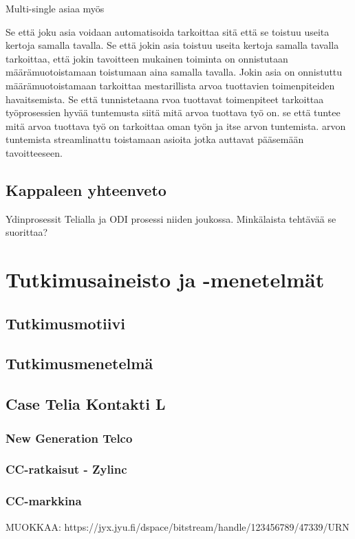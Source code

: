 \documentclass[finnish,12pt,a4paper,pdftex]{article}
\begin{document}
Multi-single asiaa myös


Se että joku asia voidaan automatisoida tarkoittaa sitä että se toistuu useita kertoja samalla tavalla. Se että jokin asia toistuu useita kertoja samalla tavalla tarkoittaa, että jokin tavoitteen mukainen toiminta on onnistutaan määrämuotoistamaan toistumaan aina samalla tavalla. Jokin asia on onnistuttu määrämuotoistamaan tarkoittaa mestarillista arvoa tuottavien toimenpiteiden havaitsemista. Se
 että tunnistetaana rvoa tuottavat toimenpiteet tarkoittaa työprosessien hyvää tuntemusta siitä mitä arvoa tuottava työ on. se että tuntee mitä arvoa tuottava työ on tarkoittaa oman työn ja itse arvon tuntemista.
arvon tuntemista
streamlinattu toistamaan asioita jotka auttavat pääsemään tavoitteeseen. 


\subsection{Kappaleen yhteenveto}


Ydinprosessit Telialla ja ODI prosessi niiden joukossa. Minkälaista tehtävää se suorittaa?

\clearpage

\section{Tutkimusaineisto ja -menetelmät}
\subsection{Tutkimusmotiivi}
\subsection{Tutkimusmenetelmä}
\subsection{Case Telia Kontakti L}
\subsubsection{New Generation Telco}
\subsubsection{CC-ratkaisut - Zylinc}
\subsubsection{CC-markkina}
MUOKKAA: https://jyx.jyu.fi/dspace/bitstream/handle/123456789/47339/URN%
\end{document}
